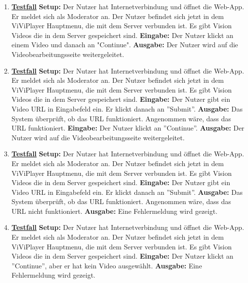\begin{enumerate}
	\item \underline{\textbf{Testfall}} \linebreak
	\textbf{Setup:} Der Nutzer hat Internetverbindung und öffnet die Web-App. Er meldet sich als Moderator an. Der Nutzer befindet sich jetzt in dem ViViPlayer Hauptmenu, die mit dem Server verbunden ist. Es gibt Vision Videos die in dem Server gespeichert sind.\linebreak
	\textbf{Eingabe:} Der Nutzer klickt an einem Video und danach an "Continue". \linebreak
	\textbf{Ausgabe:} Der Nutzer wird auf die Videobearbeitungsseite weitergeleitet. 
	
	\item \underline{\textbf{Testfall}} \linebreak
	\textbf{Setup:} Der Nutzer hat Internetverbindung und öffnet die Web-App. Er meldet sich als Moderator an. Der Nutzer befindet sich jetzt in dem ViViPlayer Hauptmenu, die mit dem Server verbunden ist. Es gibt Vision Videos die in dem Server gespeichert sind.\linebreak
	\textbf{Eingabe:} Der Nutzer gibt ein Video URL in Eingabefeld ein. Er klickt danach an ''Submit''. \linebreak
	\textbf{Ausgabe:} Das System überprüft, ob das URL funktioniert. Angenommen wäre, dass das URL funktioniert. \linebreak
	\textbf{Eingabe:} Der Nutzer klickt an ''Continue''.\linebreak
	\textbf{Ausgabe:} Der Nutzer wird auf die Videobearbeitungsseite weitergeleitet.
	
	\item \underline{\textbf{Testfall}} \linebreak
	\textbf{Setup:} Der Nutzer hat Internetverbindung und öffnet die Web-App. Er meldet sich als Moderator an. Der Nutzer befindet sich jetzt in dem ViViPlayer Hauptmenu, die mit dem Server verbunden ist. Es gibt Vision Videos die in dem Server gespeichert sind.\linebreak
	\textbf{Eingabe:} Der Nutzer gibt ein Video URL in Eingabefeld ein. Er klickt danach an ''Submit''. \linebreak
	\textbf{Ausgabe:} Das System überprüft, ob das URL funktioniert. Angenommen wäre, dass das URL nicht funktioniert. \linebreak
	\textbf{Ausgabe:} Eine Fehlermeldung wird gezeigt.
	
	\item \underline{\textbf{Testfall}} \linebreak
	\textbf{Setup:} Der Nutzer hat Internetverbindung und öffnet die Web-App. Er meldet sich als Moderator an. Der Nutzer befindet sich jetzt in dem ViViPlayer Hauptmenu, die mit dem Server verbunden ist. Es gibt Vision Videos die in dem Server gespeichert sind.\linebreak
	\textbf{Eingabe:} Der Nutzer klickt an ''Continue'', aber er hat kein Video ausgewählt. \linebreak
	\textbf{Ausgabe:} Eine Fehlermeldung wird gezeigt.
	

\end{enumerate}
